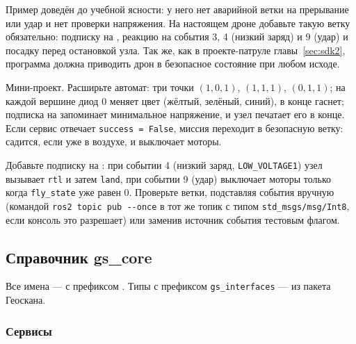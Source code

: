 \begin{warnbox}
Пример доведён до учебной ясности: у него нет аварийной ветки на прерывание или удар и нет проверки напряжения. На настоящем дроне добавьте такую ветку обязательно: подписку на , реакцию на события 3, 4 (низкий заряд) и 9 (удар) и посадку перед остановкой узла. Так же, как в проекте-патруле главы~\ref{sec:sdk2}, программа должна приводить дрон в безопасное состояние при любом исходе.
\end{warnbox}

\begin{taskbox}
Мини-проект. Расширьте автомат: три точки $(1, 0, 1)$, $(1, 1, 1)$, $(0, 1, 1)$; на каждой вершине диод 0 меняет цвет (жёлтый, зелёный, синий), в конце гаснет; подписка на  запоминает минимальное напряжение, и узел печатает его в конце. Если сервис отвечает \verb|success = False|, миссия переходит в безопасную ветку: садится, если уже в воздухе, и выключает моторы.
\end{taskbox}

\begin{taskbox}
Добавьте подписку на : при событии 4 (низкий заряд, \texttt{LOW\_VOLTAGE1}) узел вызывает \verb|rtl| и затем \verb|land|, при событии 9 (удар) выключает моторы только когда \verb|fly_state| уже равен 0. Проверьте ветки, подставляя события вручную (командой \verb|ros2 topic pub --once| в тот же топик с типом \texttt{std\_msgs/msg/Int8}, если консоль это разрешает) или заменив источник события тестовым флагом.
\end{taskbox}

\subsection{Справочник gs\_core}

Все имена --- с префиксом . Типы с префиксом \verb|gs_interfaces| --- из пакета Геоскана.

\subsubsection*{Сервисы}

